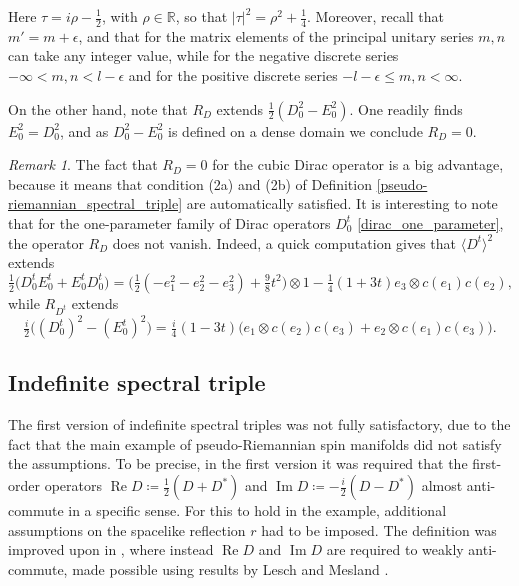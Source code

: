 \documentclass{amsart}
\theoremstyle{definition}
\theoremstyle{remark}
\newtheorem{remark}[theorem]{Remark}
\DeclareMathOperator{\Ree}{Re}
\DeclareMathOperator{\Imm}{Im}
\numberwithin{equation}{section}
\begin{document}
Here $\tau=i\rho-\tfrac{1}{2}$, with $\rho\in\mathbb{R}$, so that $|\tau|^2=\rho^2+\tfrac{1}{4}$. Moreover, recall that $m'=m+\epsilon$, and that for the matrix elements of the principal unitary series $m,n$ can take any integer value, while for the negative discrete series $-\infty<m,n<l-\epsilon$ and for the positive discrete series $-l-\epsilon\leq m,n<\infty$. 

On the other hand, note that $R_D$ extends $\tfrac{1}{2}(D_0^2-E_0^2)$. One readily finds $E_0^2=D_0^2$, and as $D_0^2-E_0^2$ is defined on a dense domain we conclude $R_D=0$. 

\begin{remark}
    The fact that $R_D=0$ for the cubic Dirac operator is a big advantage, because it means that condition (2a) and (2b) of Definition \ref{pseudo-riemannian_spectral_triple} are automatically satisfied. It is interesting to note that for the one-parameter family of Dirac operators $D^t_0$ \eqref{dirac_one_parameter}, the operator $R_D$ does not vanish. Indeed, a quick computation gives that $\langle D^t\rangle^2$ extends
    \begin{equation}\label{one-parameter_positive_squared}
        \tfrac{1}{2}\big(D^t_0E^t_0+E^t_0D^t_0\big)=\Big(\tfrac{1}{2}(-e_1^2-e_2^2-e_3^2)+\tfrac{9}{8}t^2\Big)\otimes 1-\tfrac{1}{4}(1+3t)e_3\otimes c(e_1)c(e_2),
    \end{equation}
    while $R_{D^t}$ extends
    \begin{equation}\label{one-parameter_R}
        \tfrac{i}{2}\big((D^t_0)^2-(E^t_0)^2\big)=\tfrac{i}{4}(1-3t)\big(e_1\otimes c(e_2)c(e_3)+e_2\otimes c(e_1)c(e_3)\big).
    \end{equation}
\end{remark}

\subsection{Indefinite spectral triple}\label{sec_indefinite}
The first version of indefinite spectral triples \cite{dungen_rennie_2016} was not fully satisfactory, due to the fact that the main example of pseudo-Riemannian spin manifolds did not satisfy the assumptions. To be precise, in the first version it was required that the first-order operators $\Ree D\coloneq \tfrac{1}{2}(D+D^*)$ and $\Imm D\coloneq -\tfrac{i}{2}(D-D^*)$ almost anti-commute in a specific sense. For this to hold in the example, additional assumptions on the spacelike reflection $r$ had to be imposed. The definition was improved upon in \cite{dungen_2019}, where instead $\Ree D$ and $\Imm D$ are required to weakly anti-commute, made possible using results by Lesch and Mesland \cite{lesch_mesland_2019}. 
\end{document}

